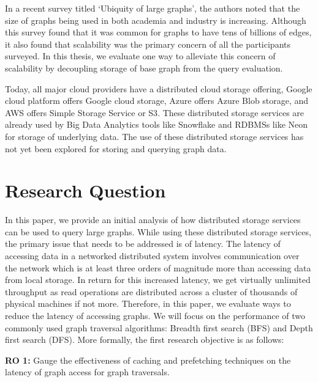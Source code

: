 In a recent survey titled `Ubiquity of large graphs'\cite{sahu2017ubiquity}, the
authors noted that the size of graphs being used in both academia and industry
is increasing. Although this survey found that it was common for graphs to have
tens of billions of edges, it also found that scalability was the primary
concern of all the participants surveyed\cite{sahu2017ubiquity}. In this thesis,
we evaluate one way to alleviate this concern of scalability by decoupling
storage of base graph from the query evaluation.

\medskip
Today, all major cloud providers have a distributed cloud storage offering,
Google cloud platform offers Google cloud storage\cite{gcpStorage}, Azure offers
Azure Blob storage\cite{azureStorage}, and AWS offers Simple Storage Service or 
S3\cite{awsS3}. These distributed storage services are already used by Big Data
Analytics tools like Snowflake\cite{snowflake} and RDBMSs like Neon\cite{neonPostgres} 
for storage of underlying data. The use of these distributed storage services has not
yet been explored for storing and querying graph data.

\section{Research Question}
In this paper, we provide an initial analysis of how distributed storage services can 
be used to query large graphs. While using these distributed storage services, the primary
issue that needs to be addressed is of latency. The latency of accessing data in a networked
distributed system involves communication over the network which is at least three orders of
magnitude more than accessing data from local storage. In return for this increased latency,
we get virtually unlimited throughput as read operations are distributed across a cluster 
of thousands of physical machines if not more. Therefore, in this paper, we evaluate ways to
reduce the latency of accessing graphs. We will focus on the 
performance of two commonly used graph traversal algorithms: Breadth first search 
(BFS) and Depth first search (DFS). More formally, the first research
objective is as follows:
\begin{displayquote}
    \textbf{RO 1:} Gauge the effectiveness of caching and prefetching techniques
    on the latency of graph access for graph traversals.
\end{displayquote}

